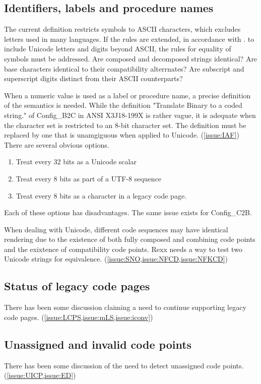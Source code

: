 \documentclass[b4paper]{article}
\begin{document}
\subsection{Identifiers, labels and procedure names}
The current definition restricts symbols to ASCII characters, which
excludes letters used in many languages. If the rules are extended, in
accordance with \cite{Annex31}.  to include Unicode letters and digits
beyond ASCII, the rules for equality of symbols must be addressed.
Are composed and decomposed strings identical? Are base characters
identical to their compatibility alterrnates? Are subscript and
superscript digits distinct from their ASCII counterparts?

When a numeric value is used as a label or procedure name, a precise
definition of the semantics is needed.  While the definition
"Translate Binary to a coded string." of Config\_B2C in ANSI X3J18-199X
is rather vague, it is adequate when the character set is restricted
to an 8-bit character set.  The definition must be replaced by one
that is unamgiguous when applied to Unicode.  (\ref{issue:IAF})
There are several
obvious options.
\begin{enumerate}
\item Treat every 32 bits as a Unicode scalar
\item Treat every 8 bits as part of a UTF-8 sequence
\item Treat every 8 bits as a character in a legacy code page.
\end{enumerate}
Each of these options has disadvantages.
The same issue exists for Config\_C2B.

When dealing with Unicode, different code sequences may have identical
rendering due to the existence of both fully composed and combining
code points and the exixtence of compatibility code points.
Rexx needs a way to test two Unicode strings for equivalence. (\cref{issue:SNO,issue:NFCD,issue:NFKCD})

\subsection{Status of legacy code pages}
There has been some discussion claiming a need to continue supporting legacy code pages. (\cref{issue:LCPS,issue:mLS,issue:iconv})

\subsection{Unassigned and invalid code points}
There has been some discussion of the need to detect unassigned code points. (\cref{issue:UICP,issue:ED})
\end{document}
